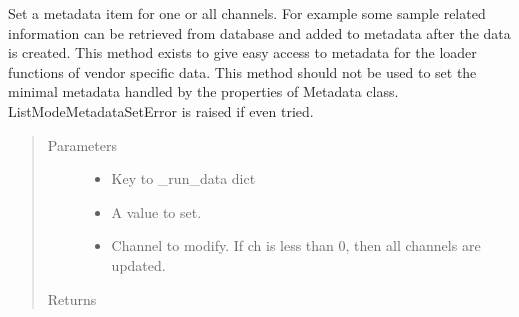 \documentclass[letterpaper,10pt,english]{sphinxmanual}
\begin{document}
\begin{fulllineitems}
\begin{fulllineitems}
\label{\detokenize{autodocs/data:listmode.data.Metadata.set}}
\sphinxAtStartPar
Set a metadata item for one or all channels. For example some sample related information can be retrieved from
database and added to metadata after the data is created. This method exists to give easy access to
metadata for the loader functions of vendor specific data. This method should not be used to set the
minimal metadata handled by the properties of Metadata class. ListModeMetadataSetError is raised if even tried.
\begin{quote}\begin{description}
\item[{Parameters}] \leavevmode\begin{itemize}
\item {} 
\sphinxAtStartPar
{} \textendash{} Key to \_run\_data dict

\item {} 
\sphinxAtStartPar
{} \textendash{} A value to set.

\item {} 
\sphinxAtStartPar
{} \textendash{} Channel to modify. If ch is less than 0, then all channels are updated.

\end{itemize}

\item[{Returns}] \leavevmode
\sphinxAtStartPar


\end{description}\end{quote}

\end{fulllineitems}


\begin{fulllineitems}
\label{\detokenize{autodocs/data:listmode.data.Metadata.start}}
\end{fulllineitems}



\end{fulllineitems}
\end{document}

